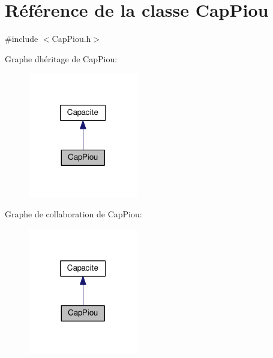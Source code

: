 \hypertarget{class_cap_piou}{}\section{Référence de la classe Cap\+Piou}
\label{class_cap_piou}


{\ttfamily \#include $<$Cap\+Piou.\+h$>$}



Graphe d\textquotesingle{}héritage de Cap\+Piou\+:\nopagebreak
\begin{figure}[H]
\begin{center}
\leavevmode
\includegraphics[width=136pt]{class_cap_piou__inherit__graph}
\end{center}
\end{figure}


Graphe de collaboration de Cap\+Piou\+:\nopagebreak
\begin{figure}[H]
\begin{center}
\leavevmode
\includegraphics[width=136pt]{class_cap_piou__coll__graph}
\end{center}
\end{figure}
